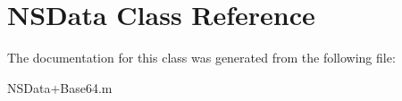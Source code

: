 \hypertarget{class_n_s_data}{
\section{NSData Class Reference}
\label{class_n_s_data}
}


The documentation for this class was generated from the following file:\begin{DoxyCompactItemize}
\item 
NSData+Base64.m\end{DoxyCompactItemize}

